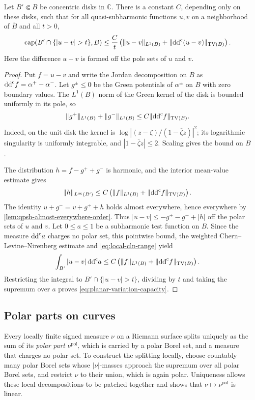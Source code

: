 \begin{lemma}\label{lem:planar-variation-capacity}
Let $B'\Subset B$ be concentric disks in $\mathbb C$. There is a constant $C$, depending only on these disks, such that for all quasi-subharmonic functions $u,v$ on a neighborhood of $\overline B$ and all $t>0$,
\begin{equation}\label{eq:planar-variation-capacity}
 \operatorname{cap}(B'\cap\{|u-v|>t\},B)
 \leq\frac Ct\left(\|u-v\|_{L^1(B)}
                   +\|\ddc(u-v)\|_{\mathrm{TV}(B)}\right).
\end{equation}
Here the difference $u-v$ is formed off the pole sets of $u$ and $v$.
\end{lemma}
\begin{proof}
Put $f=u-v$ and write the Jordan decomposition on $B$ as $\mathrm{dd}^{\mathrm{c}} f=\alpha^+-\alpha^-$. Let $g^\pm\leq0$ be the Green potentials of $\alpha^\pm$ on $B$ with zero boundary values. The $L^1(B)$ norm of the Green kernel of the disk is bounded uniformly in its pole, so
\[
 \|g^+\|_{L^1(B)}+\|g^-\|_{L^1(B)}
 \leq C\|\mathrm{dd}^{\mathrm{c}} f\|_{\mathrm{TV}(B)}.
\]
Indeed, on the unit disk the kernel is $\log|(z-\zeta)/(1-\overline\zeta z)|^2$; its logarithmic singularity is uniformly integrable, and $|1-\overline\zeta z|\leq2$. Scaling gives the bound on $B$.

The distribution $h=f-g^++g^-$ is harmonic, and the interior mean-value estimate gives
\[
 \|h\|_{L^\infty(B')}
 \leq C\left(\|f\|_{L^1(B)}+\|\mathrm{dd}^{\mathrm{c}} f\|_{\mathrm{TV}(B)}\right).
\]
The identity $u+g^-=v+g^++h$ holds almost everywhere, hence everywhere by \cref{lem:qpsh-almost-everywhere-order}. Thus $|u-v|\leq-g^+-g^-+|h|$ off the polar sets of $u$ and $v$. Let $0\leq a\leq1$ be a subharmonic test function on $B$. Since the measure $\mathrm{dd}^{\mathrm{c}} a$ charges no polar set, this pointwise bound, the weighted Chern--Levine--Nirenberg estimate and \eqref{eq:local-cln-range} yield
\[
 \int_{B'}|u-v|\,\mathrm{dd}^{\mathrm{c}} a
 \leq C\left(\|f\|_{L^1(B)}+\|\mathrm{dd}^{\mathrm{c}} f\|_{\mathrm{TV}(B)}\right).
\]
Restricting the integral to $B'\cap\{|u-v|>t\}$, dividing by $t$ and taking the supremum over $a$ proves \eqref{eq:planar-variation-capacity}.
\end{proof}

\subsection{Polar parts on curves}
\label{sec:local-polar-parts}

Every locally finite signed measure $\nu$ on a Riemann surface splits uniquely as the sum of its \emph{polar part} $\nu^{\mathrm{pol}}$, which is carried by a polar Borel set, and a measure that charges no polar set. To construct the splitting locally, choose countably many polar Borel sets whose $|\nu|$-masses approach the supremum over all polar Borel sets, and restrict $\nu$ to their union, which is again polar. Uniqueness allows these local decompositions to be patched together and shows that $\nu\mapsto\nu^{\mathrm{pol}}$ is linear.

